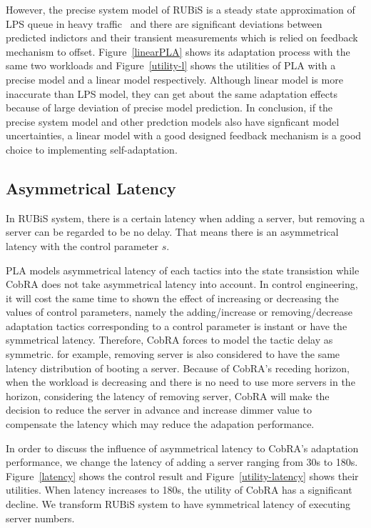 \documentclass[sigconf]{acmart}
\begin{document}
However, the precise system model of RUBiS is a steady state approximation of LPS queue in heavy traffic~\cite{zhang2008steady} and there are significant deviations between predicted indictors and their transient measurements which is relied on feedback mechanism to offset. Figure~\ref{linearPLA} shows its adaptation process with the same two workloads and Figure~\ref{utility-l} shows the utilities of PLA with a precise model and a linear model respectively. Although linear model is more inaccurate than LPS model, they can get about the same adaptation effects because of large deviation of precise model prediction. In conclusion, if the precise system model and other predction models also have signficant model uncertainties, a linear model with a good designed feedback mechanism is a good choice to implementing self-adaptation.

\subsection{Asymmetrical Latency}
In RUBiS system, there is a certain latency when adding a server, but removing a server can be regarded to be no delay. That means there is an asymmetrical latency with the control parameter $s$.

PLA models asymmetrical latency of each tactics into the state transistion while CobRA does not  take asymmetrical latency into account. In control engineering, it will cost the same time to shown the effect of increasing or decreasing the values of control parameters, namely the adding/increase or removing/decrease adaptation tactics corresponding to a control parameter is instant or have the symmetrical latency. Therefore, CobRA forces to model the tactic delay as symmetric. for example, removing server is also considered to have the same latency distribution of booting a server. Because of CobRA's receding horizon, when the workload is decreasing and there is no need to use more servers in the horizon, considering the latency of removing server, CobRA will make the decision to reduce the server in advance and increase dimmer value to compensate the latency which may reduce the adapation performance.

In order to discuss the influence of asymmetrical latency to CobRA's adaptation performance, we change the latency of adding a server ranging from 30s to 180s. Figure~\ref{latency} shows the control result and Figure~\ref{utility-latency} shows their utilities. When latency increases to 180s, the utility of CobRA has a significant decline. We transform RUBiS system to have symmetrical latency of executing server numbers. 
\end{document}
